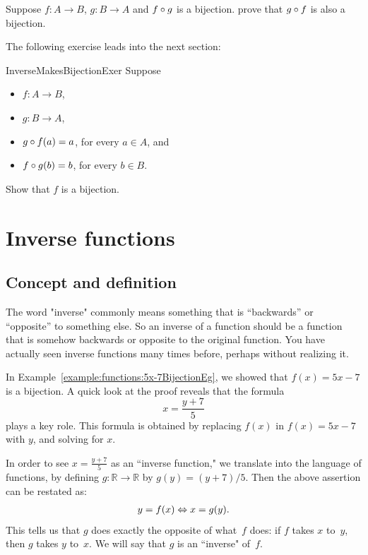\begin{exercise}{}
 Suppose $f \colon A \to B$, $g \colon B \to A$ and $f \circ g$ is a bijection. prove that $g \circ f$ is also a bijection.
\end{exercise}

The following exercise leads into the next section:

 \begin{exercise}{InverseMakesBijectionExer}
 Suppose 
 \begin{itemize}
 \item $f \colon A \to B$,
 \item  $g \colon B \to A$,
 \item $g \circ f(a) = a$, for every $a \in A$,
 and
 \item $f \circ g(b) = b$, for every $b \in B$.
 \end{itemize}
 Show that $f$ is a bijection.
 \end{exercise}
  
 
 \section{Inverse functions\quad
{}} \label{inverse}

\subsection{Concept and definition}

The word "inverse" commonly means something that is ``backwards'' or ``opposite'' to something else.  So an inverse of a function should be  a function that is somehow backwards or opposite to the original  function.  
You have actually seen inverse functions many times before, perhaps without realizing it.

\begin{example}{}
In Example~\ref{example:functions:5x-7BijectionEg}, we showed that $f(x) = 5x - 7$ is a bijection. A quick look at the proof reveals that the formula
$$x =  \frac{y+7}{5} $$
plays a key role.  This formula is obtained by replacing $f(x)$ in $f(x) = 5x - 7$ with $y$, and solving for $x$.

In order to see $x = \frac{y+7}{5}$ as an ``inverse function," we translate into the language of functions, by defining $g \colon \mathbb{R} \to \mathbb{R}$  by $g(y) = (y+7)/5$. Then the above assertion can be restated as:
\begin{align*} \label{y=f(x)<>x=g(y)}
 y = f(x) \Leftrightarrow x = g(y) .
 \end{align*}
This tells us that $g$ does exactly the opposite of what~$f$ does: if $f$ takes $x$ to~$y$, then $g$ takes $y$ to~$x$. We will say that $g$ is an ``inverse" of~$f$.
\end{example}

